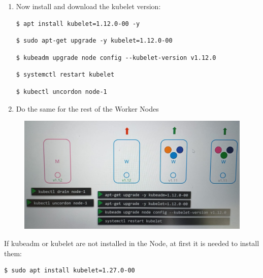\documentclass{article}
\newenvironment{blocktemplateIII}[1]{%
    \tcolorbox[beamer,%
    noparskip,breakable,
    ,colframe=Red,%
    colbacklower=LimeGreen!75!LightGreen,%
    title=#1]}%
    {\endtcolorbox}
\newenvironment{codetemplate}[1][]{%
  \mybasecolorbox[#1]
  \itshape
}{%
  \endmybasecolorbox
}
\begin{document}
\begin{enumerate}
    \item Now install and download the kubelet version:
\begin{codetemplate}{}
\begin{verbatim}
$ apt install kubelet=1.12.0-00 -y
\end{verbatim}
\end{codetemplate}
\begin{codetemplate}{}
\begin{verbatim}
$ sudo apt-get upgrade -y kubelet=1.12.0-00
\end{verbatim}
\end{codetemplate}
\begin{codetemplate}{}
\begin{verbatim}
$ kubeadm upgrade node config --kubelet-version v1.12.0
\end{verbatim}
\end{codetemplate}
\begin{codetemplate}{}
\begin{verbatim}
$ systemctl restart kubelet
\end{verbatim}
\end{codetemplate}
\begin{codetemplate}{}
\begin{verbatim}
$ kubectl uncordon node-1
\end{verbatim}
\end{codetemplate}

    \item Do the same for the rest of the Worker Nodes
\end{enumerate}

\begin{figure}[H]
    \includegraphics[width=\textwidth]{pictures/clusup2.png}
\end{figure}

\begin{blocktemplateIII}{WARNING}
If kubeadm or kubelet are not installed in the Node, at first it is needed to install them:
\begin{codetemplate}{}
\begin{verbatim}
$ sudo apt install kubelet=1.27.0-00
\end{verbatim}
\end{codetemplate}
\end{blocktemplateIII}
\end{document}
